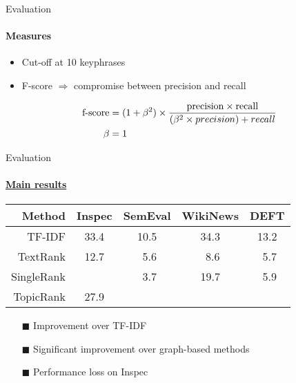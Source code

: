   \begin{frame}{Evaluation}
    \framesubtitle{Measures}

    \begin{itemize}
      \item{Cut-off at 10 keyphrases}
      \item{F-score $\Rightarrow$ compromise between precision and recall}
    \end{itemize}

    \begin{align}
      \text{f-score} &= (1 + \beta^2) \times \frac{\text{precision} \times \text{recall}}{(\beta^2 \times precision) + recall} \notag\\
      \beta &= 1 \notag
    \end{align}
  \end{frame}

  \begin{frame}[label=main_results]{Evaluation}
    \framesubtitle{\hyperlink{main_results_backup}{Main results}}
    
    \begin{center}
      \begin{tabular}{rcccc}
        \toprule
        \textbf{Method} & \textbf{Inspec} & \textbf{SemEval} & \textbf{WikiNews} & \textbf{DEFT}\\
        \midrule
        TF-IDF & 33.4 & 10.5 & 34.3 & 13.2\\
        TextRank & 12.7 & $~~$5.6 & $~~$8.6 & $~~$5.7\\
        SingleRank & \cellcolor{pink}{35.2} & $~~$3.7 & 19.7 & $~~$5.9\\
        TopicRank & 27.9 & \cellcolor{pink}{12.1} & \cellcolor{pink}{35.6} & \cellcolor{pink}{15.1}\\
        \bottomrule
      \end{tabular}
    \end{center}

    \begin{itemize}
      \item[\footnotesize\color{green}$\blacksquare$]{Improvement over TF-IDF}
      \item[\footnotesize\color{green}$\blacksquare$]{Significant improvement
                                                      over graph-based methods}
      \item[\footnotesize\color{red}$\blacksquare$]{Performance loss on Inspec}
    \end{itemize}
  \end{frame}

